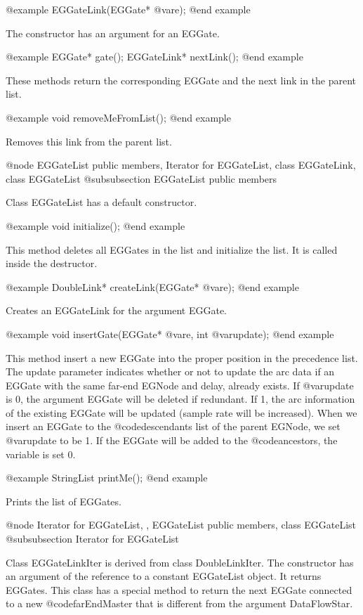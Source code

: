 @example
EGGateLink(EGGate* @var{e});
@end example

The constructor has an argument for an EGGate. 

@example
EGGate* gate();
EGGateLink* nextLink();
@end example

These methods return the corresponding EGGate and the next link in the parent
list.

@example
void removeMeFromList();
@end example

Removes this link from the parent list.

@node EGGateList public members, Iterator for EGGateList, class EGGateLink, class EGGateList
@subsubsection EGGateList public members

Class EGGateList has a default constructor. 

@example
void initialize();
@end example

This method deletes all EGGates in the list and initialize the list.
It is called inside the destructor.

@example
DoubleLink* createLink(EGGate* @var{e});
@end example

Creates an EGGateLink for the argument EGGate.

@example
void insertGate(EGGate* @var{e}, int @var{update});
@end example

This method insert a new EGGate into the proper position in the precedence
list. The update parameter indicates whether or not to update the arc
data if an EGGate with the same far-end EGNode and delay, already exists.
If @var{update} is 0, the argument EGGate will be deleted if redundant.
If 1, the arc information of the existing EGGate will be updated (sample
rate will be increased). When we insert an EGGate to the
@code{descendants} list of the parent EGNode, we set @var{update} to be 1.
If the EGGate will be added to the @code{ancestors}, the variable is set 0.

@example
StringList printMe();
@end example

Prints the list of EGGates.

@node Iterator for EGGateList, , EGGateList public members, class EGGateList
@subsubsection Iterator for EGGateList

Class EGGateLinkIter is derived from class DoubleLinkIter. The constructor
has an argument of the reference to a constant EGGateList object. It returns
EGGates. This class has a special method to return the next EGGate connected
to a new @code{farEndMaster} that is different from the argument DataFlowStar.

